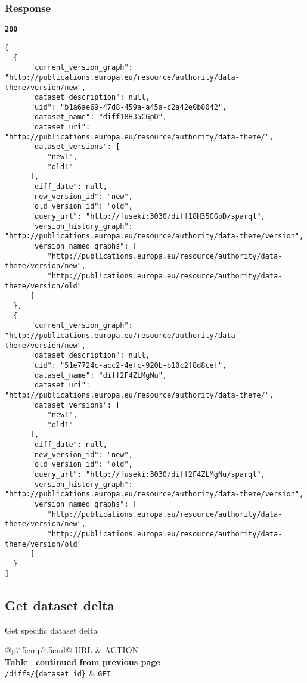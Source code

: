 \subsubsection{Response}
\textbf{\texttt{200}}
\begin{lstlisting}
[
  {
      "current_version_graph": "http://publications.europa.eu/resource/authority/data-theme/version/new",
      "dataset_description": null,
      "uid": "b1a6ae69-47d8-459a-a45a-c2a42e0b8042",
      "dataset_name": "diff18H35CGpD",
      "dataset_uri": "http://publications.europa.eu/resource/authority/data-theme/",
      "dataset_versions": [
          "new1",
          "old1"
      ],
      "diff_date": null,
      "new_version_id": "new",
      "old_version_id": "old",
      "query_url": "http://fuseki:3030/diff18H35CGpD/sparql",
      "version_history_graph": "http://publications.europa.eu/resource/authority/data-theme/version",
      "version_named_graphs": [
          "http://publications.europa.eu/resource/authority/data-theme/version/new",
          "http://publications.europa.eu/resource/authority/data-theme/version/old"
      ]
  },
  {
      "current_version_graph": "http://publications.europa.eu/resource/authority/data-theme/version/new",
      "dataset_description": null,
      "uid": "51e7724c-acc2-4efc-920b-b10c2f8d8cef",
      "dataset_name": "diff2F4ZLMgNu",
      "dataset_uri": "http://publications.europa.eu/resource/authority/data-theme/",
      "dataset_versions": [
          "new1",
          "old1"
      ],
      "diff_date": null,
      "new_version_id": "new",
      "old_version_id": "old",
      "query_url": "http://fuseki:3030/diff2F4ZLMgNu/sparql",
      "version_history_graph": "http://publications.europa.eu/resource/authority/data-theme/version",
      "version_named_graphs": [
          "http://publications.europa.eu/resource/authority/data-theme/version/new",
          "http://publications.europa.eu/resource/authority/data-theme/version/old"
      ]
  }
]
\end{lstlisting}

\subsection{Get dataset delta}
Get specific dataset delta

\begin{longtable}[c]{@{}p{7.5cm}p{7.5cm}l@{}}
  \toprule
  URL                             & ACTION                    \\* \midrule
  \endfirsthead
  \multicolumn{3}{c}%
  {{\bfseries Table \thetable\ continued from previous page}} \\
  \endhead
  \bottomrule
  \endfoot
  \endlastfoot
  \texttt{/diffs/\{dataset\_id\}} & \texttt{GET}              \\* \bottomrule
  \label{tab:rdf-differ-get-diffs}                            \\
\end{longtable}

